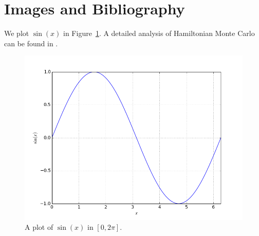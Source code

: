 \section{Images and Bibliography}
We plot $\sin(x)$ in Figure~\ref{fig:sin_x}. A detailed analysis of Hamiltonian Monte Carlo can be found in \cite{Neal2012}.

\begin{figure}
    \includegraphics[scale=0.5]{../img/sin_x.png}
    \caption{A plot of $\sin(x)$ in $[0,2\pi]$. \label{fig:sin_x}}
\end{figure}
